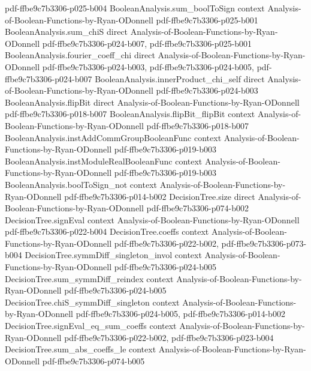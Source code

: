 \begin{theorem}
  {pdf-ffbe9c7b3306-p025-b004}
\proofstep
  {BooleanAnalysis.sum_boolToSign}
  {context}
  {Analysis-of-Boolean-Functions-by-Ryan-ODonnell}
  {pdf-ffbe9c7b3306-p025-b001}
\proofstep
  {BooleanAnalysis.sum_chiS}
  {direct}
  {Analysis-of-Boolean-Functions-by-Ryan-ODonnell}
  {pdf-ffbe9c7b3306-p024-b007,
    pdf-ffbe9c7b3306-p025-b001}
\proofstep
  {BooleanAnalysis.fourier_coeff_chi}
  {direct}
  {Analysis-of-Boolean-Functions-by-Ryan-ODonnell}
  {pdf-ffbe9c7b3306-p024-b003,
    pdf-ffbe9c7b3306-p024-b005,
    pdf-ffbe9c7b3306-p024-b007}
\proofstep
  {BooleanAnalysis.innerProduct_chi_self}
  {direct}
  {Analysis-of-Boolean-Functions-by-Ryan-ODonnell}
  {pdf-ffbe9c7b3306-p024-b003}
\proofstep
  {BooleanAnalysis.flipBit}
  {direct}
  {Analysis-of-Boolean-Functions-by-Ryan-ODonnell}
  {pdf-ffbe9c7b3306-p018-b007}
\proofstep
  {BooleanAnalysis.flipBit_flipBit}
  {context}
  {Analysis-of-Boolean-Functions-by-Ryan-ODonnell}
  {pdf-ffbe9c7b3306-p018-b007}
\proofstep
  {BooleanAnalysis.instAddCommGroupBooleanFunc}
  {context}
  {Analysis-of-Boolean-Functions-by-Ryan-ODonnell}
  {pdf-ffbe9c7b3306-p019-b003}
\proofstep
  {BooleanAnalysis.instModuleRealBooleanFunc}
  {context}
  {Analysis-of-Boolean-Functions-by-Ryan-ODonnell}
  {pdf-ffbe9c7b3306-p019-b003}
\proofstep
  {BooleanAnalysis.boolToSign_not}
  {context}
  {Analysis-of-Boolean-Functions-by-Ryan-ODonnell}
  {pdf-ffbe9c7b3306-p014-b002}
\proofstep
  {DecisionTree.size}
  {direct}
  {Analysis-of-Boolean-Functions-by-Ryan-ODonnell}
  {pdf-ffbe9c7b3306-p074-b002}
\proofstep
  {DecisionTree.signEval}
  {context}
  {Analysis-of-Boolean-Functions-by-Ryan-ODonnell}
  {pdf-ffbe9c7b3306-p022-b004}
\proofstep
  {DecisionTree.coeffs}
  {context}
  {Analysis-of-Boolean-Functions-by-Ryan-ODonnell}
  {pdf-ffbe9c7b3306-p022-b002,
    pdf-ffbe9c7b3306-p073-b004}
\proofstep
  {DecisionTree.symmDiff_singleton_invol}
  {context}
  {Analysis-of-Boolean-Functions-by-Ryan-ODonnell}
  {pdf-ffbe9c7b3306-p024-b005}
\proofstep
  {DecisionTree.sum_symmDiff_reindex}
  {context}
  {Analysis-of-Boolean-Functions-by-Ryan-ODonnell}
  {pdf-ffbe9c7b3306-p024-b005}
\proofstep
  {DecisionTree.chiS_symmDiff_singleton}
  {context}
  {Analysis-of-Boolean-Functions-by-Ryan-ODonnell}
  {pdf-ffbe9c7b3306-p024-b005,
    pdf-ffbe9c7b3306-p014-b002}
\proofstep
  {DecisionTree.signEval_eq_sum_coeffs}
  {context}
  {Analysis-of-Boolean-Functions-by-Ryan-ODonnell}
  {pdf-ffbe9c7b3306-p022-b002,
    pdf-ffbe9c7b3306-p023-b004}
\proofstep
  {DecisionTree.sum_abs_coeffs_le}
  {context}
  {Analysis-of-Boolean-Functions-by-Ryan-ODonnell}
  {pdf-ffbe9c7b3306-p074-b005}

\end{theorem}
